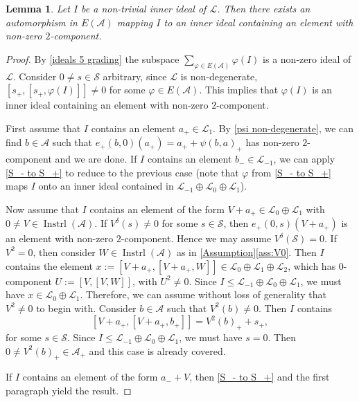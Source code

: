 \documentclass[oneside,a4paper]{amsart} %
\newtheorem{lemma}[theorem]{Lemma}
\theoremstyle{definition}
\DeclareMathOperator{\Inst}{Instrl}
\newcommand{\A}{\mathcal{A}}
\renewcommand{\SS}{\mathcal{S}}
\newcommand{\LL}{\mathcal{L}}
\numberwithin{equation}{section}
\begin{document}
\begin{lemma}
\label{-1 0 1}
	Let $I$ be a non-trivial inner ideal of $\LL$. Then there exists an automorphism in $E(\A)$ mapping $I$ to an inner ideal containing an element with non-zero $2$-component.
\end{lemma}
\begin{proof}
	By \cref{ideals 5 grading} the subspace $\sum_{\varphi\in E(\A)}\varphi(I)$ is a non-zero ideal of $\LL$.
	Consider $0\neq s\in \SS$ arbitrary, since $\LL$ is non-degenerate, $[s_+,[s_+,\varphi(I)]]\neq 0$ for some $\varphi\in E(\A)$.
	This implies that $\varphi(I)$ is an inner ideal containing an element with non-zero $2$-component.
	\iffalse 
	
	First assume that $I$ contains an element $a_+ \in \LL_1$. By \cref{psi non-degenerate}, we can find $b\in\A$ such that $e_+(b,0)(a_+) =  a_+ + \psi(b,a)_+$ has non-zero $2$-component and we are done. If $I$ contains an element $b_- \in \LL_{-1}$, we can apply \cref{S_- to S_+} to reduce to the previous case (note that $\varphi$ from \cref{S_- to S_+} maps $I$ onto an inner ideal contained in $\LL_{-1}\oplus \LL_0\oplus \LL_1$).

	Now assume that $I$ contains an element of the form $V + a_+ \in \LL_0 \oplus \LL_1$ with $0 \neq V\in\Inst(\A)$. 
	If $V^\delta (s)\neq 0$ for some $s\in\SS$, then $e_+(0,s)(V + a_+)$ is an element with non-zero $2$-component. 
	Hence we may assume $V^\delta(\SS)=0$. 
	If $V^2=0$, then consider $W \in \Inst(\A)$ as in \cref{Assumption}\cref{ass:V0}. Then $I$ contains the element $x:=[V + a_+, [V + a_+, W]] \in \LL_0 \oplus \LL_1 \oplus \LL_2$, which has $0$-component $U:=[V,[V,W]]$, with $U^2\neq 0$. 
	Since $I\leq \LL_{-1} \oplus \LL_0\oplus \LL_{1}$, we must have $x\in \LL_0 \oplus \LL_1$.
	Therefore, we can assume without loss of generality that $V^2 \neq 0$ to begin with.
	Consider $b\in\A$ such that $V^2(b)\neq 0$. Then $I$ contains 
	\[ [V + a_+, [V + a_+, b_+]]=V^2(b)_+ + s_+, \]
	for some $s \in \SS$. Since $I\leq \LL_{-1} \oplus \LL_0\oplus \LL_{1}$, we must have $s=0$.
	Then $0\neq V^2(b)_+\in\A_+$ and this case is already covered. 
	
	If $I$ contains an element of the form $a_- + V$, then \cref{S_- to S_+} and the first paragraph yield the result.


\end{proof}
\end{document}
